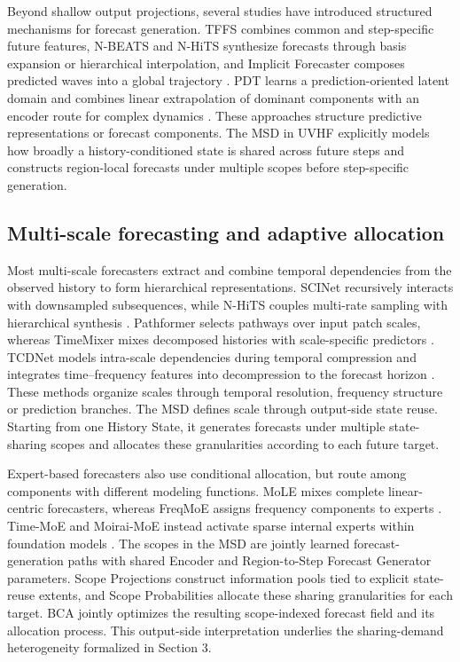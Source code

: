 \documentclass[final,3p,times]{elsarticle}
\begin{document}
Beyond shallow output projections, several studies have introduced structured mechanisms for forecast generation. TFFS combines common and step-specific future features, N-BEATS and N-HiTS synthesize forecasts through basis expansion or hierarchical interpolation, and Implicit Forecaster composes predicted waves into a global trajectory \citep{zhang2024tffs,oreshkin2020nbeats,challu2023nhits,li2025implicit}. PDT learns a prediction-oriented latent domain and combines linear extrapolation of dominant components with an encoder route for complex dynamics \citep{ying2026pdt}. These approaches structure predictive representations or forecast components. The MSD in UVHF explicitly models how broadly a history-conditioned state is shared across future steps and constructs region-local forecasts under multiple scopes before step-specific generation.

\subsection{Multi-scale forecasting and adaptive allocation}


Most multi-scale forecasters extract and combine temporal dependencies from the observed history to form hierarchical representations. SCINet recursively interacts with downsampled subsequences, while N-HiTS couples multi-rate sampling with hierarchical synthesis \citep{liu2022scinet,challu2023nhits}. Pathformer selects pathways over input patch scales, whereas TimeMixer mixes decomposed histories with scale-specific predictors \citep{chen2024pathformer,wang2024timemixer}. TCDNet models intra-scale dependencies during temporal compression and integrates time--frequency features into decompression to the forecast horizon \citep{li2026tcdnet}. These methods organize scales through temporal resolution, frequency structure or prediction branches. The MSD defines scale through output-side state reuse. Starting from one History State, it generates forecasts under multiple state-sharing scopes and allocates these granularities according to each future target.

Expert-based forecasters also use conditional allocation, but route among components with different modeling functions. MoLE mixes complete linear-centric forecasters, whereas FreqMoE assigns frequency components to experts \citep{ni2024mole,liu2025freqmoe}. Time-MoE and Moirai-MoE instead activate sparse internal experts within foundation models \citep{shi2025timemoe,liu2025moiraimoe}. The scopes in the MSD are jointly learned forecast-generation paths with shared Encoder and Region-to-Step Forecast Generator parameters. Scope Projections construct information pools tied to explicit state-reuse extents, and Scope Probabilities allocate these sharing granularities for each target. BCA jointly optimizes the resulting scope-indexed forecast field and its allocation process. This output-side interpretation underlies the sharing-demand heterogeneity formalized in Section 3.
\end{document}
